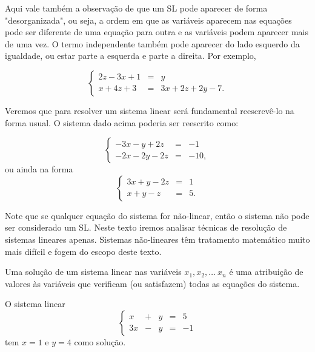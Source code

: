 \begin{ex}
Aqui vale também a observação de que um SL pode aparecer de forma "desorganizada", ou seja, a ordem em que as variáveis aparecem nas equações pode ser diferente de uma equação para outra e as variáveis podem aparecer mais de uma vez. O termo independente também pode aparecer do lado esquerdo da igualdade, ou estar parte a esquerda e parte a direita.
Por exemplo,

\begin{equation*}
\left\{
\begin{array}{ccc}
2z-3x+1 & = &y \\
x+4z+3& = & 3x+2z+2y-7.
\end{array}
\right.
\end{equation*}

Veremos que para resolver um sistema linear será fundamental reescrevê-lo na forma usual. O sistema dado acima poderia ser reescrito como:

\begin{equation*}
\left\{
\begin{array}{ccc}
-3x-y+2z & = & -1 \\
-2x-2y-2z & = & -10,
\end{array}
\right.
\end{equation*}
ou ainda na forma
\begin{equation*}
\left\{
\begin{array}{ccc}
3x+y-2z & = & 1 \\
x+y-z & = & 5.
\end{array}
\right.
\end{equation*}
\end{ex}

Note que se qualquer equação do sistema for não-linear, então o sistema não pode ser considerado um SL.
Neste texto iremos analisar técnicas de resolução de sistemas lineares apenas. Sistemas não-lineares têm tratamento matemático muito mais difícil e fogem do escopo deste texto.


\bigskip

\begin{defn}  Uma solução de um sistema linear nas variáveis $x_1, x_2 , \hdots \ x_n$
é uma %
atribuição de valores
às variáveis que verificam (ou satisfazem) todas as equações do sistema.
\end{defn}

\begin{ex}
O sistema linear
\begin{equation*}
\left\{
\begin{array}{ccccc}
x&+&y&=&5 \\
3x&-&y&=&-1
\end{array}
\right.
\end{equation*}
tem $x=1$ e $y=4$ como solução.

\end{ex}

